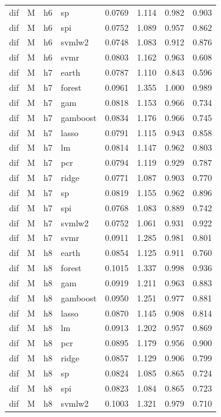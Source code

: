 \begin{ThreePartTable}
\begin{longtable}[t]{llclcccc}
dif & M & h6 & sp & 0.0769 & 1.114 & 0.982 & 0.903\\
dif & M & h6 & spi & 0.0752 & 1.089 & 0.957 & 0.862\\
dif & M & h6 & svmlw2 & 0.0748 & 1.083 & 0.912 & 0.876\\
dif & M & h6 & svmr & 0.0803 & 1.162 & 0.963 & 0.608\\
\addlinespace
dif & M & h7 & earth & 0.0787 & 1.110 & 0.843 & 0.596\\
dif & M & h7 & forest & 0.0961 & 1.355 & 1.000 & 0.989\\
dif & M & h7 & gam & 0.0818 & 1.153 & 0.966 & 0.734\\
dif & M & h7 & gamboost & 0.0834 & 1.176 & 0.966 & 0.745\\
dif & M & h7 & lasso & 0.0791 & 1.115 & 0.943 & 0.858\\
dif & M & h7 & lm & 0.0814 & 1.147 & 0.962 & 0.803\\
dif & M & h7 & pcr & 0.0794 & 1.119 & 0.929 & 0.787\\
dif & M & h7 & ridge & 0.0771 & 1.087 & 0.903 & 0.770\\
dif & M & h7 & sp & 0.0819 & 1.155 & 0.962 & 0.896\\
dif & M & h7 & spi & 0.0768 & 1.083 & 0.889 & 0.742\\
dif & M & h7 & svmlw2 & 0.0752 & 1.061 & 0.931 & 0.922\\
dif & M & h7 & svmr & 0.0911 & 1.285 & 0.981 & 0.801\\
\addlinespace
dif & M & h8 & earth & 0.0854 & 1.125 & 0.911 & 0.760\\
dif & M & h8 & forest & 0.1015 & 1.337 & 0.998 & 0.936\\
dif & M & h8 & gam & 0.0919 & 1.211 & 0.963 & 0.883\\
dif & M & h8 & gamboost & 0.0950 & 1.251 & 0.977 & 0.881\\
dif & M & h8 & lasso & 0.0870 & 1.145 & 0.908 & 0.814\\
dif & M & h8 & lm & 0.0913 & 1.202 & 0.957 & 0.869\\
dif & M & h8 & pcr & 0.0895 & 1.179 & 0.956 & 0.900\\
dif & M & h8 & ridge & 0.0857 & 1.129 & 0.906 & 0.799\\
dif & M & h8 & sp & 0.0824 & 1.085 & 0.865 & 0.724\\
dif & M & h8 & spi & 0.0823 & 1.084 & 0.865 & 0.723\\
dif & M & h8 & svmlw2 & 0.1003 & 1.321 & 0.979 & 0.710\\

\end{longtable}
\end{ThreePartTable}
